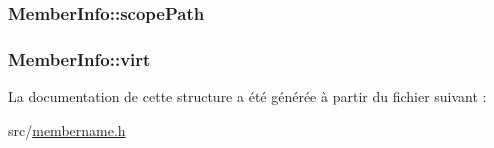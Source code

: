 \subsubsection[{scope\+Path}]{ Member\+Info\+::scope\+Path}\label{struct_member_info_abff55577ccd419a0173058f1f0cb5d72}
\hypertarget{struct_member_info_abcad9848a77db55ca329fbd675c5d2c5}{}
\subsubsection[{virt}]{ Member\+Info\+::virt}\label{struct_member_info_abcad9848a77db55ca329fbd675c5d2c5}


La documentation de cette structure a été générée à partir du fichier suivant \+:\begin{DoxyCompactItemize}
\item 
src/\hyperlink{membername_8h}{membername.\+h}\end{DoxyCompactItemize}
